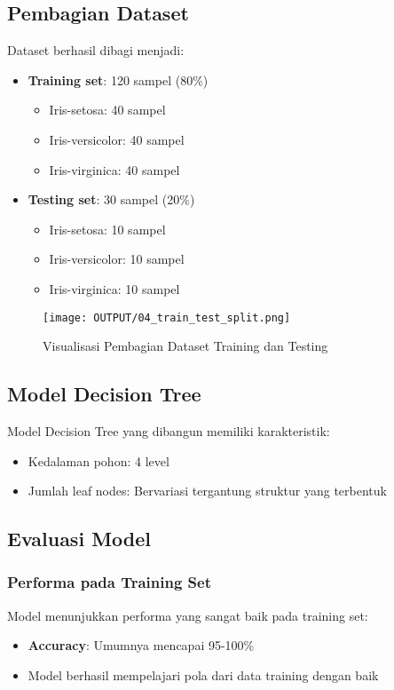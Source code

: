 \documentclass[11pt,a4paper]{article}
\begin{document}
\clearpage

\subsection{Pembagian Dataset}
Dataset berhasil dibagi menjadi:
\begin{itemize}
    \item \textbf{Training set}: 120 sampel (80\%)
    \begin{itemize}
        \item Iris-setosa: 40 sampel
        \item Iris-versicolor: 40 sampel
        \item Iris-virginica: 40 sampel
    \end{itemize}
    \item \textbf{Testing set}: 30 sampel (20\%)
    \begin{itemize}
        \item Iris-setosa: 10 sampel
        \item Iris-versicolor: 10 sampel
        \item Iris-virginica: 10 sampel
    \end{itemize}
\end{itemize}

\begin{figure}[h]
    \centering
    \texttt{[image: OUTPUT/04\_train\_test\_split.png]}
    \caption{Visualisasi Pembagian Dataset Training dan Testing}
    \label{fig:train_test_split}
\end{figure}

\subsection{Model Decision Tree}
Model Decision Tree yang dibangun memiliki karakteristik:
\begin{itemize}
    \item Kedalaman pohon: 4 level
    \item Jumlah leaf nodes: Bervariasi tergantung struktur yang terbentuk
\end{itemize}

\subsection{Evaluasi Model}

\subsubsection{Performa pada Training Set}
Model menunjukkan performa yang sangat baik pada training set:
\begin{itemize}
    \item \textbf{Accuracy}: Umumnya mencapai 95-100\%
    \item Model berhasil mempelajari pola dari data training dengan baik
\end{itemize}
\end{document}
